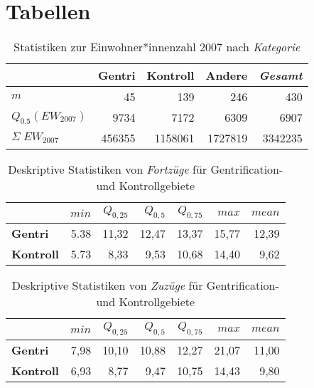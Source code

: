 \newpage
\section{Tabellen}

\begin{table}[h]
\centering
\begin{tabular}{@{}lrrrr@{}}
\toprule
                                       & \multicolumn{1}{r}{{\bf Gentri}} & \multicolumn{1}{r}{{\bf Kontroll}} & \multicolumn{1}{r}{{\bf Andere}} & \multicolumn{1}{r}{{\bf \textit{Gesamt}}} \\ \midrule
$m$                                    & 45                               & 139                                & 246                              & 430                                  \\
$Q_{0.5}(EW_{2007})$                   & 9734                             & 7172                               & 6309                             & 6907                                 \\
$\Sigma\;EW_{2007}$                    & 456355                           & 1158061                            & 1727819                          & 3342235                              \\ \bottomrule
\end{tabular}
\caption{Statistiken zur Einwohner*innenzahl 2007 nach \textit{Kategorie}}\label{tab:KategorieEW}
\end{table}            

\begin{table}[h]
\centering
\begin{tabular}{@{}lrrrrrr@{}}
\toprule
               & $min$ & $Q_{0,25}$ & $Q_{0,5}$ & $Q_{0,75}$ & $max$ & $mean$ \\ \midrule
{\bf Gentri}   & 5.38 & 11,32 & 12,47 & 13,37 & 15,77 & 12,39 \\
{\bf Kontroll} & 5.73 &  8,33 &  9,53 & 10,68 & 14,40 & 9,62 \\ \bottomrule
\end{tabular}
\caption{Deskriptive Statistiken von \textit{Fortzüge} für Gentrification- und Kontrollgebiete}
\label{tab:FortzuegeR}
\end{table}

\begin{table}[h]
\centering
\begin{tabular}{@{}lrrrrrr@{}}
\toprule
               & $min$ & $Q_{0,25}$ & $Q_{0,5}$ & $Q_{0,75}$ & $max$ & $mean$ \\ \midrule
{\bf Gentri}   & 7,98 & 10,10 & 10,88 & 12,27 & 21,07 & 11,00 \\
{\bf Kontroll} & 6,93 & 8,77 & 9,47 & 10,75 & 14,43 &  9,80  \\ \bottomrule
\end{tabular}
\caption{Deskriptive Statistiken von \textit{Zuzüge} für Gentrification- und Kontrollgebiete}
\label{tab:ZuzuegeR}
\end{table}

